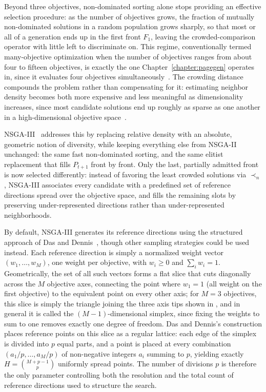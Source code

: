 Beyond three objectives, non-dominated sorting alone stops providing an effective selection procedure: as the number of objectives grows, the fraction of mutually non-dominated solutions in a random population grows sharply, so that most or all of a generation ends up in the first front $F_1$, leaving the crowded-comparison operator with little left to discriminate on. This regime, conventionally termed many-objective optimization when the number of objectives ranges from about four to fifteen objectives, is exactly the one Chapter~\ref{chapter:pagegen} operates in, since it evaluates four objectives simultaneously~\cite{nsga-iii-pt1}. The crowding distance compounds the problem rather than compensating for it: estimating neighbor density becomes both more expensive and less meaningful as dimensionality increases, since most candidate solutions end up roughly as sparse as one another in a high-dimensional objective space~\cite{nsga-iii-pt1}.

NSGA-III~\cite{nsga-iii-pt1} addresses this by replacing relative density with an absolute, geometric notion of diversity, while keeping everything else from NSGA-II unchanged: the same fast non-dominated sorting, and the same elitist replacement that fills $P_{t+1}$ front by front. Only the last, partially admitted front is now selected differently: instead of favoring the least crowded solutions via $\prec_n$, NSGA-III associates every candidate with a predefined set of reference directions spread over the objective space, and fills the remaining slots by preserving under-represented directions rather than under-represented neighborhoods.


By default, NSGA-III generates its reference directions using the structured approach of Das and Dennis~\cite{das-dennis}, though other sampling strategies could be used instead. Each reference direction is simply a normalized weight vector $(w_1, \dots, w_M)$, one weight per objective, with $w_i \geq 0$ and $\sum_i w_i = 1$. Geometrically, the set of all such vectors forms a flat slice that cuts diagonally across the $M$ objective axes, connecting the point where $w_1=1$ (all weight on the first objective) to the equivalent point on every other axis; for $M=3$ objectives, this slice is simply the triangle joining the three axis tips shown in , and in general it is called the $(M-1)$-dimensional simplex, since fixing the weights to sum to one removes exactly one degree of freedom. Das and Dennis's construction places reference points on this slice as a regular lattice: each edge of the simplex is divided into $p$ equal parts, and a point is placed at every combination $(a_1/p, \dots, a_M/p)$ of non-negative integers $a_i$ summing to $p$, yielding exactly $H = \binom{M+p-1}{p}$ uniformly spread points. The number of divisions $p$ is therefore the only parameter controlling both the resolution and the total count of reference directions used to structure the search.



